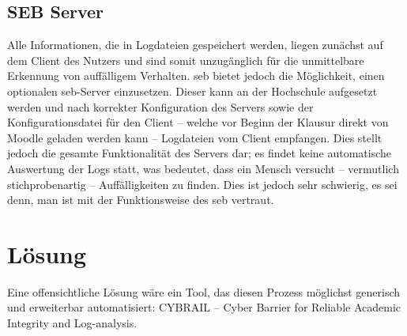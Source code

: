 \subsection{SEB Server}
Alle Informationen, die in Logdateien gespeichert werden, liegen zunächst auf dem Client des Nutzers und sind somit unzugänglich für die unmittelbare Erkennung von auffälligem Verhalten. 
\gls{seb} bietet jedoch die Möglichkeit, einen optionalen \gls{seb}-Server einzusetzen. 
Dieser kann an der Hochschule aufgesetzt werden und nach korrekter Konfiguration des Servers sowie der Konfigurationsdatei für den Client – welche vor Beginn der Klausur direkt von Moodle geladen werden kann – Logdateien vom Client empfangen. 
Dies stellt jedoch die gesamte Funktionalität des Servers dar; 
es findet keine automatische Auswertung der Logs statt, was bedeutet, dass ein Mensch versucht – vermutlich stichprobenartig – Auffälligkeiten zu finden. 
Dies ist jedoch sehr schwierig, es sei denn, man ist mit der Funktionsweise des \gls{seb} vertraut.

\section{Lösung}
Eine offensichtliche Lösung wäre ein Tool, das diesen Prozess möglichst generisch und erweiterbar automatisiert: CYBRAIL – Cyber Barrier for Reliable Academic Integrity and Log-analysis.
